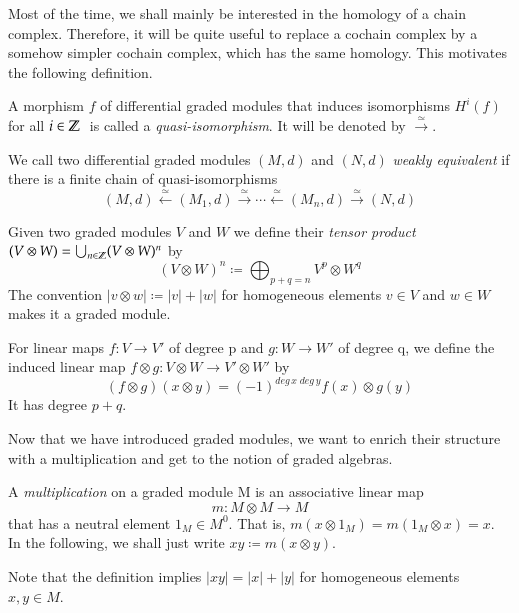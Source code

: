 Most of the time, we shall mainly be interested in the homology of a chain complex. Therefore, it will be quite useful to replace
a cochain complex by a somehow simpler cochain complex, which has the same homology. This motivates the following definition.

\begin{Definition}
 A morphism $f$ of differential graded modules that induces isomorphisms $H^i(f)$ for all $i \in \mathbb{Z} \;$ is called a
 \emph{quasi-isomorphism}. It will be denoted by $\overset{\simeq}{\longrightarrow}$.
 
 We call two differential graded modules $(M,d)$ and $(N,d)$ \emph{weakly equivalent} if there is a finite chain of 
 quasi-isomorphisms
 $$ (M,d) \overset{\simeq}{\leftarrow} (M_1,d) \overset{\simeq}{\rightarrow} \cdots 
 \overset{\simeq}{\leftarrow} (M_n,d) \overset{\simeq}{\rightarrow} (N,d)$$
\end{Definition}

\begin{Definition}
 Given two graded modules $V$ and $W$ we define their \emph{tensor product}
 $(V \otimes W) = \bigcup_{n \in \mathbb{Z}} (V \otimes W)^n $ by 
 $$ (V \otimes W)^n \coloneqq \bigoplus_{p + q = n} V^p \otimes W^q$$
 The convention $|v \otimes w| \coloneqq |v| + |w|$ for homogeneous elements $v \in V$ and $w \in W$
 makes it a graded module. 
 
 For linear maps $f \colon V \to V'$ of degree p and $g \colon W \to W'$ of degree q, we define the induced linear map
  ${f \otimes g \colon V \otimes W \to V' \otimes W'}$ by
 $$ (f \otimes g) ( x \otimes y) = (-1)^{deg \, x \; deg \,y} f(x) \otimes g(y) $$
  It has degree $p+q$.
 \end{Definition}

Now that we have introduced graded modules, we want to enrich their structure with a multiplication and get to 
the notion of graded algebras.
 
 \begin{Definition}

 A \emph{multiplication} on a graded module M is an associative linear map
 $${m \colon M \otimes M \to M }$$ that has a neutral element $1_M \in M^0$. That is, $m(x \otimes 1_M) = m(1_M \otimes x) = x$.
 In the following, we shall just write $xy \coloneqq m(x \otimes y)$.
 \end{Definition}

 Note that the definition implies $|xy| = |x| + |y|$ for homogeneous elements $x,y \in M$.
 

